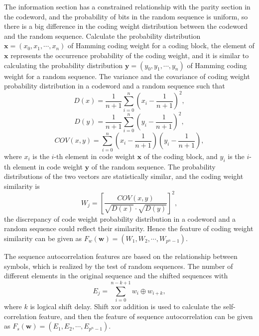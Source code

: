 \documentclass[conference]{IEEEtran}
\begin{document}
The information section has a constrained relationship with the parity section in the codeword, and the probability of bits in the random sequence is uniform, so there is a big difference in the coding weight distribution between the codeword and the random sequence. Calculate the probability distribution $\boldsymbol{x} = (x_0, x_1, \cdots, x_n)$ of Hamming coding weight for a coding block, the element of $\boldsymbol{x}$ represents the occurrence probability of the coding weight, and it is similar to calculating the probability distribution $\boldsymbol{y} = (y_0, y_1, \cdots, y_n)$ of Hamming coding weight for a random sequence. The variance and the covariance of coding weight probability distribution in a codeword and a random sequence such that
\begin{equation}
	D(x) = \frac{1}{n + 1} \sum_{i = 0}^{n}\left(x_i-\frac{1}{n + 1}\right)^{2},
\end{equation}
\begin{equation}
	D(y) = \frac{1}{n + 1} \sum_{i = 0}^{n}\left(y_i-\frac{1}{n + 1}\right)^{2},
\end{equation}
\begin{equation}
		COV(x, y) = \sum_{i = 0}^{n}\left(x_i - \frac{1}{n + 1}\right)\left(y_i - \frac{1}{n + 1}\right),
\end{equation}
where $x_i$ is the $i$-th element in code weight $\boldsymbol{x}$ of the coding block, and $y_i$ is the $i$-th element in code weight $\boldsymbol{y}$ of the random sequence. The probability distributions of the two vectors are statistically similar, and the coding weight similarity is
\begin{equation}
	W_j = \left[\frac{COV(x, y)}{\sqrt{D(x)} \cdot \sqrt{D(y)}}\right]^2,
\end{equation}
the discrepancy of code weight probability distribution in a codeword and a random sequence could reflect their similarity. Hence the feature of coding weight similarity can be given as $F_w(\boldsymbol{w}) = (W_1, W_2, \cdots, W_{p^n - 1})$.

The sequence autocorrelation features are based on the relationship between symbols, which is realized by the test of random sequences. The number of different elements in the original sequence and the shifted sequences with
\begin{equation}
	E_j = \sum_{i = 0}^{n - k + 1} w_{i} \oplus w_{i + k},
\end{equation}
where $k$ is logical shift delay. Shift xor addition is used to calculate the self-correlation feature, and then the feature of sequence autocorrelation can be given as $F_s(\boldsymbol{w}) = (E_1, E_2, \cdots, E_{p^n - 1})$.
\end{document}

